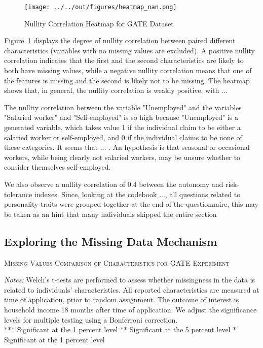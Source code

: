 \begin{figure}[t]
    \caption{Nullity Correlation Heatmap for GATE Dataset}
    \texttt{[image: ../../out/figures/heatmap\_nan.png]}
    \label{fig:heatmap_nan}
\end{figure}

Figure~\ref{fig:heatmap_nan} displays the degree of nullity correlation between paired different characteristics (variables with no missing values are excluded). A positive nullity correlation indicates that the first and the second characteristics are likely to both have missing values, while a negative nullity correlation means that one of the features is missing and the second is likely not to be missing. The heatmap shows that, in general, the nullity correlation is weakly positive, with ...

The nullity correlation between the variable "Unemployed" and the variables "Salaried worker" and "Self-employed" is so high because "Unemployed" is a generated variable, which takes value 1 if the individual claim to be either a salaried worker or self-employed, and 0 if the individual claims to be none of these categories. It seems that ... . An hypothesis is that seasonal or occasional workers, while being clearly not salaried workers, may be unsure whether to consider themselves self-employed.

We also observe a nullity correlation of 0.4 between the autonomy and risk-tolerance indexes. Since, looking at the codebook ..., all questions related to personality traits were grouped together at the end of the questionnaire,  this may be taken as an hint that many individuals skipped the entire section


\subsection{Exploring the Missing Data Mechanism}

\begin{table}[t!]
\centering
\caption{\textsc{Missing Values Comparison of Characteristics for GATE Experiment}}
\begin{adjustbox}{width=\textwidth,totalheight=\textheight,keepaspectratio}

\end{adjustbox}


\label{tab:table_missing}
\medskip
\raggedright
\footnotesize
\textit{Notes:} Welch's t-tests are performed to assess whether missingness in the data is related to individuals' characteristics.
All reported characteristics are measured at time of application, prior to random assignment. The outcome of interest is household income 18 months after time of application. We adjust the significance levels for multiple testing using a Bonferroni correction. \\
*** Significant at the 1 percent level ** Significant at the 5 percent level * Significant at the 1 percent level
\end{table}

